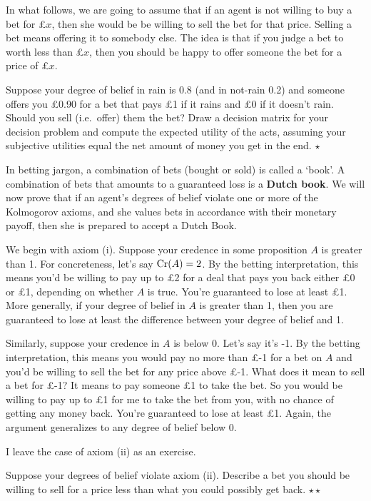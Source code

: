 In what follows, we are going to assume that if an agent is not
willing to buy a bet for £$x$, then she would be be willing to sell
the bet for that price. Selling a bet means offering it to somebody
else. The idea is that if you judge a bet to worth less than £$x$,
then you should be happy to offer someone the bet for a price of £$x$.

\begin{exercise}
  Suppose your degree of belief in rain is $0.8$ (and in not-rain 0.2)
  and someone offers you £0.90 for a bet that pays £1 if it rains and
  £0 if it doesn't rain. Should you sell (i.e.\ offer) them the bet?
  Draw a decision matrix for your decision problem and compute the
  expected utility of the acts, assuming your subjective utilities
  equal the net amount of money you get in the end. $\star$
\end{exercise}

In betting jargon, a combination of bets (bought or sold) is called a
`book'. A combination of bets that amounts to a guaranteed loss is a
\textbf{Dutch book}. We will now prove that if an agent's degrees of
belief violate one or more of the Kolmogorov axioms, and she values
bets in accordance with their monetary payoff, then she is prepared to
accept a Dutch Book.

We begin with axiom (i). Suppose your credence in some proposition $A$
is greater than 1. For concreteness, let's say $\text{Cr}(A)=2$. By the
betting interpretation, this means you'd be willing to pay up to £2
for a deal that pays you back either £0 or £1, depending on whether
$A$ is true. You're guaranteed to lose at least £1. More generally, if
your degree of belief in $A$ is greater than 1, then you are
guaranteed to lose at least the difference between your degree of
belief and 1.

Similarly, suppose your credence in $A$ is below 0. Let's say it's
-1. By the betting interpretation, this means you would pay no more
than £-1 for a bet on $A$ and you'd be willing to sell the bet for any
price above £-1. What does it mean to sell a bet for £-1?  It means to
pay someone £1 to take the bet. So you would be willing to pay up to
£1 for me to take the bet from you, with no chance of getting any
money back. You're guaranteed to lose at least £1. Again, the argument
generalizes to any degree of belief below 0.

I leave the case of axiom (ii) as an exercise.

\begin{exercise}
  Suppose your degrees of belief violate axiom (ii). Describe a bet
  you should be willing to sell for a price less than what you could
  possibly get back. $\star\star$
\end{exercise}

